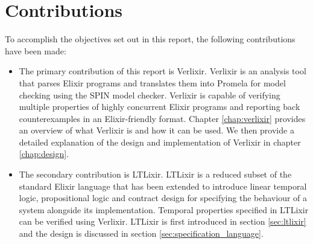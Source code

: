 \section{Contributions}
To accomplish the objectives set out in this report, the following contributions have been made:
\begin{itemize}
    \item The primary contribution of this report is Verlixir. Verlixir is an analysis tool that parses Elixir programs and translates them into Promela \cite{promela} for model checking using the SPIN \cite{spin} model checker. Verlixir is capable of verifying multiple properties of highly concurrent Elixir programs and reporting back counterexamples in an Elixir-friendly format. Chapter \ref{chap:verlixir} provides an overview of what Verlixir is and how it can be used. We then provide a detailed explanation of the design and implementation of Verlixir in chapter \ref{chap:design}.
    \item The secondary contribution is LTLixir. LTLixir is a reduced subset of the standard Elixir language that has been extended to introduce linear temporal logic, propositional logic and contract design for specifying the behaviour of a system alongside its implementation. Temporal properties specified in LTLixir can be verified using Verlixir. LTLixir is first introduced in section \ref{sec:ltlixir} and the design is discussed in section \ref{sec:specification_language}.
\end{itemize}